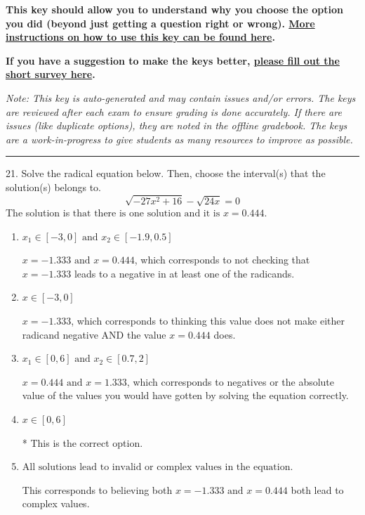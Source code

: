 \documentclass{extbook}[14pt]
\begin{document}
\textbf{This key should allow you to understand why you choose the option you did (beyond just getting a question right or wrong). \href{https://xronos.clas.ufl.edu/mac1105spring2020/courseDescriptionAndMisc/Exams/LearningFromResults}{More instructions on how to use this key can be found here}.}

\textbf{If you have a suggestion to make the keys better, \href{https://forms.gle/CZkbZmPbC9XALEE88}{please fill out the short survey here}.}

\textit{Note: This key is auto-generated and may contain issues and/or errors. The keys are reviewed after each exam to ensure grading is done accurately. If there are issues (like duplicate options), they are noted in the offline gradebook. The keys are a work-in-progress to give students as many resources to improve as possible.}

\rule{\textwidth}{0.4pt}

21. Solve the radical equation below. Then, choose the interval(s) that the solution(s) belongs to.
\[ \sqrt{-27 x^2 + 16} - \sqrt{24 x} = 0 \] 
The solution is $ \text{that there is one solution and it is } x = 0.444. $ 

\begin{enumerate}[label=\Alph*.] 
\item $ x_1 \in [-3, 0] \text{ and } x_2 \in [-1.9,0.5] $ 

 $x = -1.333 \text{ and } x = 0.444$, which corresponds to not checking that $x = -1.333$ leads to a negative in at least one of the radicands. 
\item $ x \in [-3,0] $ 

 $x = -1.333$, which corresponds to thinking this value does not make either radicand negative AND the value $x = 0.444$ does. 
\item $ x_1 \in [0, 6] \text{ and } x_2 \in [0.7,2] $ 

 $x = 0.444 \text{ and } x = 1.333$, which corresponds to negatives or the absolute value of the values you would have gotten by solving the equation correctly. 
\item $ x \in [0,6] $ 

 * This is the correct option. 
\item $ \text{All solutions lead to invalid or complex values in the equation.} $ 

 This corresponds to believing both $x = -1.333 \text{ and } x = 0.444$ both lead to complex values. 
\end{enumerate} 
 
\end{document}
